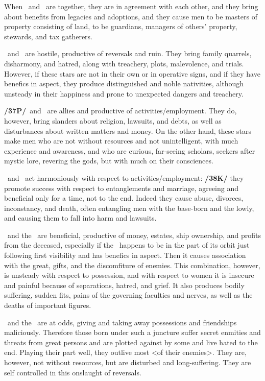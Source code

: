 When \Saturn\, and \Jupiter\, are together, they are in agreement with each other, and they bring about benefits from legacies and adoptions, and they cause men to be masters of property consisting of land, to be guardians, managers of others’ property, stewards, and tax gatherers.

\Saturn\, and \Mars\, are hostile, productive of reversals and ruin. They bring family quarrels, disharmony,
and hatred, along with treachery, plots, malevolence, and trials. However, if these stars are not in their own or in operative signs, and if they have benefics in aspect, they produce distinguished and noble nativities, although unsteady in their happiness and prone to unexpected dangers and treachery.

\textbf{/37P/}\Saturn\, and \Mercury\, are allies and productive of activities/employment. They do, however, bring slanders about religion, lawsuits, and debts, as well as disturbances about written matters and money. On the other hand, these stars make men who are not without resources and not unintelligent, with much experience and awareness, and who are curious, far-seeing scholars, seekers after mystic lore,
revering the gods, but with much on their consciences.

\Saturn\, and \Venus\, act harmoniously with respect to activities/employment: \textbf{/38K/} they promote success with respect to entanglements and marriage, agreeing and beneficial only for a time, not to the end. Indeed they cause abuse, divorces, inconstancy, and death, often entangling men with the base-born and the lowly, and causing them to fall into harm and lawsuits.

\Saturn\, and the \Moon\, are beneficial, productive of money, estates, ship ownership, and profits from the deceased, \mndl especially if the \Moon\, happens to be in the part of its orbit just following first visibility and has benefics in aspect. Then it causes association with the great, gifts, and the discomfiture of enemies. This combination, however, is unsteady with respect to possession, and with respect to women it is insecure and painful because of separations, hatred, and grief. It also produces bodily suffering, sudden fits, pains of
the governing faculties and nerves, as well as the deaths of important figures.

\Saturn\, and the \Sun\, are at odds, giving and taking away possessions and friendships maliciously. Therefore those born under such a juncture suffer secret enmities and threats from great persons and are plotted against by some and live hated to the end. Playing their part well, they outlive most <of their enemies>. They are, however, not without resources, but are disturbed and long-suffering. They are self controlled in this onslaught of reversals.


